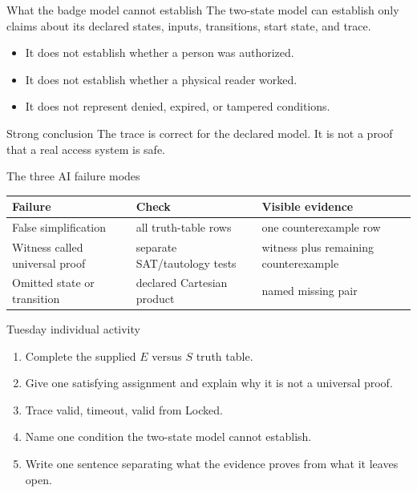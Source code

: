\begin{frame}{What the badge model cannot establish}
The two-state model can establish only claims about its declared states,
inputs, transitions, start state, and trace.
\begin{itemize}
\item It does not establish whether a person was authorized.
\item It does not establish whether a physical reader worked.
\item It does not represent denied, expired, or tampered conditions.
\end{itemize}
\begin{block}{Strong conclusion}
The trace is correct for the declared model. It is not a proof that a real access system is safe.
\end{block}
\end{frame}

\begin{frame}{The three AI failure modes}
\begin{tabular}{@{}p{4.3cm}p{4.4cm}p{3.6cm}@{}}
\textbf{Failure} & \textbf{Check} & \textbf{Visible evidence}\\\midrule
False simplification & all truth-table rows & one counterexample row\\[4pt]
Witness called universal proof & separate SAT/tautology tests & witness plus remaining counterexample\\[4pt]
Omitted state or transition & declared Cartesian product & named missing pair
\end{tabular}
\medskip
{}
\end{frame}

\begin{frame}{Tuesday individual activity}
\begin{enumerate}
\item Complete the supplied $E$ versus $S$ truth table.
\item Give one satisfying assignment and explain why it is not a universal proof.
\item Trace valid, timeout, valid from Locked.
\item Name one condition the two-state model cannot establish.
\item Write one sentence separating what the evidence proves from what it leaves open.
\end{enumerate}
\end{frame}

